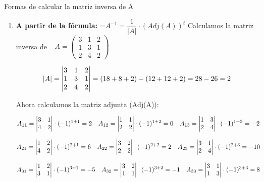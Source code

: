 \documentclass[11pt,a4paper]{article}
\newcommand{\fmm}[1]{\setbox0=\hbox{$#1$}\ifdim\wd0>\linewidth\fmdisp{#1}\else\mbox{\box0}\fi}
\newcommand{\fmdisp}[1]{\[\setbox2=\hbox{$\displaystyle #1$}\ifdim\wd2>\linewidth\resizebox{\linewidth}{!}{\box2}\else\box2\fi\]}
\begin{document}
\begin{fmex}{Formas de calcular la matriz inversa de A}
\begin{enumerate}[label=\textbf{\arabic*.},leftmargin=*]
Entonces:

\fmdisp{\boxed{A^{-1}=\begin{pmatrix}-5 & 2\\ 3 & -1\end{pmatrix}}}

\item \textbf{A partir de la fórmula:} \fmm{A^{-1}=\dfrac{1}{|A|}\cdot(Adj(A))^t}\newline
          Calculamos la matriz inversa de \fmm{A=\begin{pmatrix}3 & 1 & 2\\ 1 & 3 & 1\\ 2 & 4 & 2\end{pmatrix}}

\fmdisp{|A|=\begin{vmatrix}3 & 1 & 2\\ 1 & 3 & 1\\ 2 & 4 & 2\end{vmatrix}=(18+8+2)-(12+12+2)=28-26=2}

Ahora calculamos la matriz adjunta (Adj(A)):

\fmdisp{A_{11}=\begin{vmatrix}3 & 1\\ 4 & 2\end{vmatrix}\cdot(-1)^{1+1}=2\quad A_{12}=\begin{vmatrix}1 & 1\\ 2 & 2\end{vmatrix}\cdot(-1)^{1+2}=0\quad A_{13}=\begin{vmatrix}1 & 3\\ 2 & 4\end{vmatrix}\cdot(-1)^{1+3}=-2}

\fmdisp{A_{21}=\begin{vmatrix}1 & 2\\ 4 & 2\end{vmatrix}\cdot(-1)^{2+1}=6\quad A_{22}=\begin{vmatrix}3 & 2\\ 2 & 2\end{vmatrix}\cdot(-1)^{2+2}=2\quad A_{23}=\begin{vmatrix}3 & 1\\ 2 & 4\end{vmatrix}\cdot(-1)^{2+3}=-10}

\fmdisp{A_{31}=\begin{vmatrix}1 & 2\\ 3 & 1\end{vmatrix}\cdot(-1)^{3+1}=-5\quad A_{32}=\begin{vmatrix}3 & 2\\ 1 & 1\end{vmatrix}\cdot(-1)^{3+2}=-1\quad A_{33}=\begin{vmatrix}3 & 1\\ 1 & 3\end{vmatrix}\cdot(-1)^{3+3}=8}


\end{enumerate}
\end{fmex}
\end{document}
